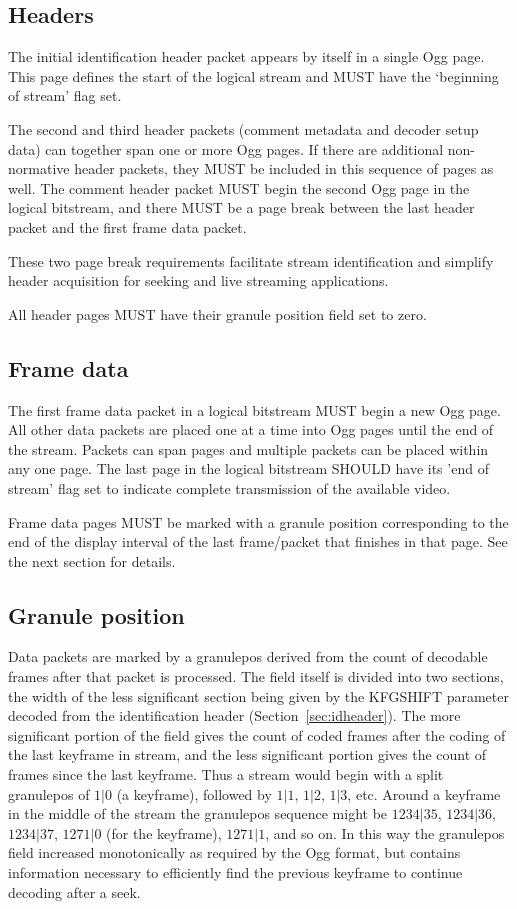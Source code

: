 \documentclass[9pt,letterpaper]{book}
\numberwithin{equation}{chapter}
\numberwithin{figure}{chapter}
\numberwithin{table}{chapter}
\begin{document}
\subsection{Headers}

The initial identification header packet appears by itself in a 
 single Ogg page.
This page defines the start of the logical stream and MUST have
 the `beginning of stream' flag set.

The second and third header packets (comment metadata and decoder
 setup data) can together span one or more Ogg pages.
If there are additional non-normative header packets, they MUST be
 included in this sequence of pages as well.
The comment header packet MUST begin the second Ogg page in the logical
 bitstream, and there MUST be a page break between the last header
 packet and the first frame data packet.

These two page break requirements facilitate stream identification and
 simplify header acquisition for seeking and live streaming applications.

All header pages MUST have their granule position field set to zero.

\subsection{Frame data}

The first frame data packet in a logical bitstream MUST begin a new Ogg 
 page.
All other data packets are placed one at a time into Ogg pages
 until the end of the stream.
Packets can span pages and multiple packets can be placed within any
 one page.
The last page in the logical bitstream SHOULD have its 
 'end of stream' flag set to indicate complete transmission
 of the available video.

Frame data pages MUST be marked with a granule position corresponding to
 the end of the display interval of the last frame/packet that finishes 
 in that page. See the next section for details.

\subsection{Granule position}

Data packets are marked by a granulepos derived from the count of decodable
frames after that packet is processed. The field itself is divided into two
sections, the width of the less significant section being given by the KFGSHIFT
parameter decoded from the identification header 
(Section~\ref{sec:idheader}).
The more significant portion of the field gives the count of coded 
frames after the coding of the last keyframe in stream, and the less 
significant portion gives the count of frames since the last keyframe.
Thus a stream would begin with a split granulepos of $1|0$ (a keyframe),
followed by $1|1$, $1|2$, $1|3$, etc. Around a  keyframe in the 
middle of the stream the granulepos sequence might be $1234|35$, 
$1234|36$, $1234|37$, $1271|0$ (for the keyframe), $1271|1$, and so
on. In this way the granulepos field increased monotonically as required 
by the Ogg format, but contains information necessary to efficiently 
find the previous keyframe to continue decoding after a seek.
\end{document}
